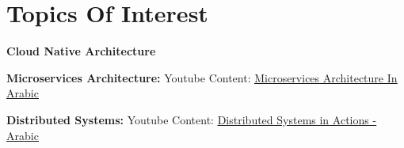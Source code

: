 \documentclass[letterpaper,11pt]{article}
\begin{document}
\section{Topics Of Interest}
    \begin{description}[font=$\bullet$\scshape\bfseries]
    \small{
    	\item \textbf{Cloud Native Architecture} 

     	\item \textbf{Microservices Architecture:} \hfill Youtube Content: \href{https://www.youtube.com/watch?v=9pGXaUaMyBo&list=PLgAqrVq84PDdfiDow3YVsgc1q34JD415Z}{\underline{Microservices Architecture In Arabic}}

     	\item \textbf{Distributed Systems: } 	  \hfill Youtube Content: \href{https://www.youtube.com/watch?v=RTdpGvrpWOI&list=PLgAqrVq84PDcg55xnbUBHuLS8tWul6-kF&pp=gAQBiAQB}{\underline{Distributed Systems in Actions - Arabic}}
    }
 \end{description}
\end{document}
